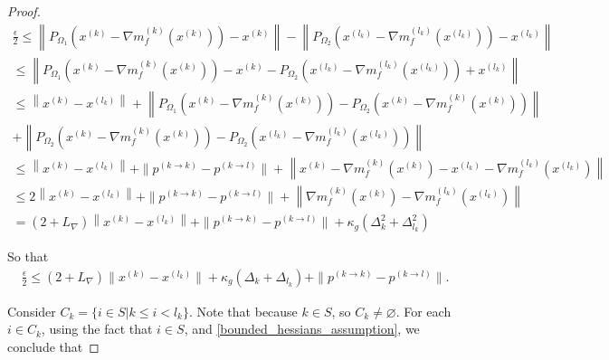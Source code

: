 \documentclass{article}
\theoremstyle{case}
\newcommand{\dk}{\Delta_k}
\newcommand{\gk}{{\nabla m_f^{(k)}(x^{(k)})}}
\newcommand{\gradf}{\nabla f}
\newcommand{\lipgrad}{{L_{\nabla}}}
\newcommand{\xk}{{x^{(k)}}}
\begin{document}
\begin{proof}
\begin{align*}
\frac{\epsilon}{2} \le \left \|P_{\Omega_1}\left(\xk - \gk\right) - \xk\right \| - \left\|P_{\Omega_2}\left(x^{(l_k)} - {\nabla m_f^{(l_k)}\left(x^{(l_k)}\right)}\right) - x^{(l_k)}\right\| \\
\le \left\|P_{\Omega_1}\left(\xk - \gk\right) - \xk - P_{\Omega_2}\left(x^{(l_k)} - {\nabla m_f^{(l_k)}\left(x^{(l_k)}\right)}\right) + x^{(l_k)}\right\| \\
\le\left\|\xk - x^{(l_k)}\right\| +  \left\|P_{\Omega_1}\left(\xk - \gk\right) - P_{\Omega_2}\left(\xk - \gk\right)\right\| \\+ \left\|P_{\Omega_2}\left(\xk - \gk\right) - P_{\Omega_2}\left(x^{(l_k)} - {\nabla m_f^{(l_k)}\left(x^{(l_k)}\right)}\right)\right\| \\
\le\left\|\xk - x^{(l_k)}\right\| + \| p^{(k\to k)} - p^{(k\to l)}\| + \left\|\xk - \gk - x^{(l_k)} - {\nabla m_f^{(l_k)}\left(x^{(l_k)}\right)}\right\| \\
\le 2\left\|\xk - x^{(l_k)}\right\| + \| p^{(k\to k)} - p^{(k\to l)}\| + \left\|\gk - {\nabla m_f^{(l_k)}\left(x^{(l_k)}\right)}\right\|\\
=   (2 + \lipgrad) \left\|\xk - x^{(l_k)}\right\| + \| p^{(k\to k)} - p^{(k\to l)}\| + \kappa_g \left(\dk^2 + \Delta_{l_k}^2\right)
\end{align*}



So that
\begin{align}
\frac{\epsilon} 2 \le \left(2 + \lipgrad\right) \|\xk - x^{(l_k)}\| + \kappa_{g}\left(\dk + \Delta_{l_k}\right) + \| p^{(k\to k)} - p^{(k\to l)}\| \label{chi2zero2_conv}.
\end{align}

Consider $C_k = \{i \in S | k \le i < l_k\}$.
Note that because $k \in S$, so $C_k \ne \varnothing $.
For each $i \in C_k$, using the fact that $i \in S$, and \cref{bounded_hessians_assumption}, we conclude that 


\end{proof}
\end{document}

